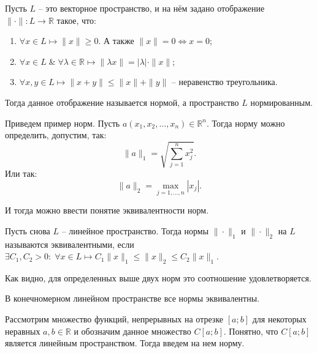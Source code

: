 \begin{definition}
	Пусть $L$ -- это векторное пространство, и на нём задано отображение $\|\cdot\|:L\longrightarrow \mathbb{R}$ такое, что:
	\begin{enumerate}
		\item $\forall x \in L \longmapsto \|x\| \geqslant 0$. А также $\|x\| = 0 \Longleftrightarrow x = 0$;
		
		\item $\forall x \in L \; \& \; \forall \lambda \in \mathbb{R} \longmapsto \|\lambda x\| = |\lambda| \cdot \|x\|$;
		
		\item $\forall x, y \in L \longmapsto \|x+y\| \leqslant \|x\| + \|y\|$ -- неравенство треугольника.
	\end{enumerate}
	Тогда данное отображение называется нормой, а пространство $L$ нормированным.
\end{definition}

\begin{example}
	Приведем пример норм. Пусть $a(x_1, x_2, \dots, x_n) \in \mathbb{R}^n$. Тогда норму можно определить, допустим, так:
	\begin{equation}
		\|a\|_1 = \sqrt{\sum_{j = 1}^{n} x_j^2}.
	\end{equation}
Или так:
	\begin{equation}
		\|a\|_2 = \max_{j = 1, \dots, n}|x_j|.
	\end{equation}
\end{example}

И тогда можно ввести понятие эквивалентности норм.

\begin{definition}
	Пусть снова $L$ -- линейное пространство. Тогда нормы $\| \cdot \|_1$ и $\| \cdot \|_2$ на $L$ называются эквивалентными, если $\exists C_1, C_2 > 0: \; \forall x \in L \longmapsto C_1\|x\|_1 \leqslant \|x\|_2 \leqslant C_2\|x\|_1$.
\end{definition}

Как видно, для определенных выше двух норм это соотношение удовлетворяется.

\begin{proposition}
	В конечномерном линейном пространстве все нормы эквивалентны.
\end{proposition}

Рассмотрим множество функций, непрерывных на отрезке $[a; b]$ для некоторых неравных $a, b \in \mathbb{R}$ и обозначим данное множество $C[a; b]$. Понятно, что $C[a; b]$ является линейным пространством. Тогда введем на нем норму.

